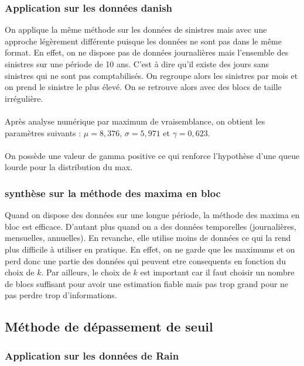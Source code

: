 \documentclass{article}
\theoremstyle{plain}
\theoremstyle{definition}
\theoremstyle{plain}
\begin{document}
\subsubsection{Application sur les données danish}
On applique la même méthode sur les données de sinistres mais avec une approche légèrement différente puisque les données ne sont pas dans le même format. En effet, on ne dispose pas de données journalières mais l'ensemble des sinistres sur une période de 10 ans. C'est à dire qu'il existe des jours sans sinistres qui ne sont pas comptabilisés.
On regroupe alors les sinistres par mois et on prend le sinistre le plus élevé. On se retrouve alors avec des blocs de taille irrégulière.
\\
\\
Après analyse numérique par maximum de vraisemblance, on obtient les paramètres suivants : $\mu = 8,376$, $\sigma = 5,971$ et $\gamma = 0,623$.
\\
\\
On possède une valeur de gamma positive ce qui renforce l'hypothèse d'une queue lourde pour la distribution du max.

\subsubsection{synthèse sur la méthode des maxima en bloc}

Quand on dispose des données sur une longue période, la méthode des maxima en bloc est efficace. D'autant plus quand on a des données temporelles (journalières, mensuelles, annuelles).
En revanche, elle utilise moins de données ce qui la rend plus difficile à utiliser en pratique. En effet, on ne garde que les maximums et on perd donc une partie des données qui peuvent etre consequents en fonction du choix de $k$.
Par ailleurs, le choix de $k$ est important car il faut choisir un nombre de blocs suffisant pour avoir une estimation fiable mais pas trop grand pour ne pas perdre trop d'informations.

\subsection{Méthode de dépassement de seuil}


\subsubsection{Application sur les données de Rain}
\end{document}

